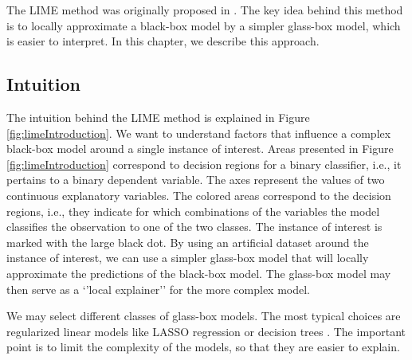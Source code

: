 \documentclass[12pt,]{krantz}
\begin{document}
The LIME method was originally proposed in \citep{lime}. The key idea behind this method is to locally approximate a black-box model by a simpler glass-box model, which is easier to interpret. In this chapter, we describe this approach.

\hypertarget{LIMEIntuition}{%
\subsection{Intuition}\label{LIMEIntuition}}

The intuition behind the LIME method is explained in Figure \ref{fig:limeIntroduction}. We want to understand factors that influence a complex black-box model around a single instance of interest. Areas presented in Figure \ref{fig:limeIntroduction} correspond to decision regions for a binary classifier, i.e., it pertains to a binary dependent variable. The axes represent the values of two continuous explanatory variables. The colored areas correspond to the decision regions, i.e., they indicate for which combinations of the variables the model classifies the observation to one of the two classes. The instance of interest is marked with the large black dot. By using an artificial dataset around the instance of interest, we can use a simpler glass-box model that will locally approximate the predictions of the black-box model. The glass-box model may then serve as a `'local explainer'' for the more complex model.

We may select different classes of glass-box models. The most typical choices are regularized linear models like LASSO regression \citep{Tibshirani94regressionshrinkage} or decision trees \citep{party2006}. The important point is to limit the complexity of the models, so that they are easier to explain.
\end{document}
